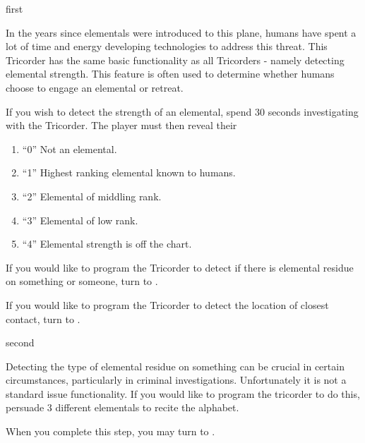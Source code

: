 \documentclass[notebook]{elementals}
\begin{document}
\startnotebook{\nTricorder{}}

\begin{page}{first}

In the years since elementals were introduced to this plane, humans have spent a lot of time and energy developing technologies to address this threat. This Tricorder has the same basic functionality as all Tricorders - namely detecting elemental strength. This feature is often used to determine whether humans choose to engage an elemental or retreat.

If you wish to detect the strength of an elemental, spend 30 seconds investigating with the Tricorder. The player must then reveal their %
\begin{enumerate}
  \item ``0'' Not an elemental.
  \item ``1'' Highest ranking elemental known to humans.
  \item ``2'' Elemental of middling rank.
  \item ``3'' Elemental of low rank.
  \item ``4'' Elemental strength is off the chart.

\end{enumerate}

If you would like to program the Tricorder to detect if there is elemental residue on something or someone, turn to .

If you would like to program the Tricorder to detect the location of closest contact, turn to .

\end{page}

\begin{page}{second}

Detecting the type of elemental residue on something can be crucial in certain circumstances, particularly in criminal investigations. Unfortunately it is not a standard issue functionality. If you would like to program the tricorder to do this, persuade 3 different elementals to recite the alphabet.

When you complete this step, you may turn to .

\end{page}
\end{document}
